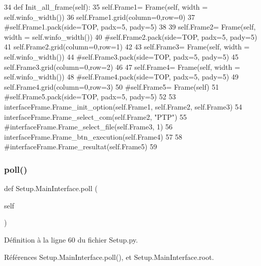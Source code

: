 \begin{DoxyCode}
34     \textcolor{keyword}{def }Init\_all\_frame(self):
35         self.Frame1= Frame(self, width = self.winfo\_width())
36         self.Frame1.grid(column=0,row=0)
37         \textcolor{comment}{#self.Frame1.pack(side=TOP, padx=5, pady=5)
}
38 
39         self.Frame2= Frame(self, width = self.winfo\_width())
40         \textcolor{comment}{#self.Frame2.pack(side=TOP, padx=5, pady=5)
}
41         self.Frame2.grid(column=0,row=1)
42         
43         self.Frame3= Frame(self, width = self.winfo\_width())
44         \textcolor{comment}{#self.Frame3.pack(side=TOP, padx=5, pady=5)
}
45         self.Frame3.grid(column=0,row=2)
46         
47         self.Frame4= Frame(self, width = self.winfo\_width())
48         \textcolor{comment}{#self.Frame4.pack(side=TOP, padx=5, pady=5)
}
49         self.Frame4.grid(column=0,row=3)
50         \textcolor{comment}{#self.Frame5= Frame(self)
}
51         \textcolor{comment}{#self.Frame5.pack(side=TOP, padx=5, pady=5)
}
52 
53         interfaceFrame.Frame\_init\_option(self.Frame1, self.Frame2, self.Frame3)
54         interfaceFrame.Frame\_select\_com(self.Frame2, \textcolor{stringliteral}{"PTP"})
55         \textcolor{comment}{#interfaceFrame.Frame\_select\_file(self.Frame3, 1)
}
56         interfaceFrame.Frame\_btn\_execution(self.Frame4)
57 
58         \textcolor{comment}{#interfaceFrame.Frame\_resultat(self.Frame5)
}
59 
\end{DoxyCode}
\mbox{\label{classSetup_1_1MainInterface_aeed36bab3e2220dbe30b6f008f94a9b3}} 
\subsubsection{\texorpdfstring{poll()}{poll()}}
{\footnotesize\ttfamily def Setup.\+Main\+Interface.\+poll (\begin{DoxyParamCaption}\item[{}]{self }\end{DoxyParamCaption})}



Définition à la ligne 60 du fichier Setup.\+py.



Références Setup.\+Main\+Interface.\+poll(), et Setup.\+Main\+Interface.\+root.



